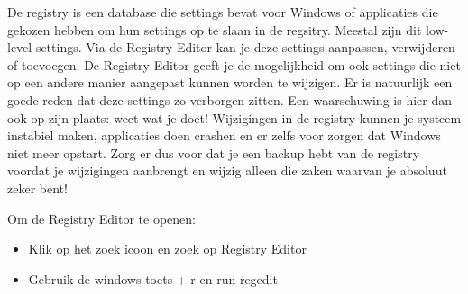 De registry is een database die settings bevat voor Windows of applicaties die gekozen hebben om hun settings op te slaan in de regsitry. Meestal zijn dit low-level settings. Via de Registry Editor kan je deze settings aanpassen, verwijderen of toevoegen. De Registry Editor geeft je de mogelijkheid om ook settings die niet op een andere manier aangepast kunnen worden te wijzigen. Er is natuurlijk een goede reden dat deze settings zo verborgen zitten. Een waarschuwing is hier dan ook op zijn plaats: weet wat je doet! Wijzigingen in de registry kunnen je systeem instabiel maken, applicaties doen crashen en er zelfs voor zorgen dat Windows niet meer opstart. Zorg er dus voor dat je een backup hebt van de registry voordat je wijzigingen aanbrengt en wijzig alleen die zaken waarvan je absoluut zeker bent!

Om de Registry Editor te openen:
\begin{itemize}
\item Klik op het zoek icoon en zoek op Registry Editor
\item Gebruik de windows-toets + r en run regedit
\end{itemize}

\begin{minipage}[t]{\linewidth}
\raggedright
{}
\end{minipage}

